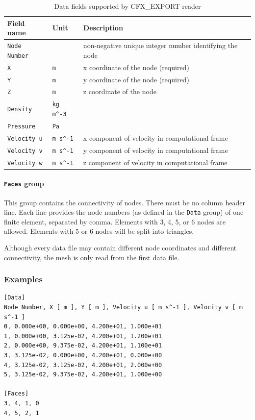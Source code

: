 \documentclass[a4paper,10pt]{article}
\begin{document}
\begin{table}[htb]
\centering
\caption{Data fields supported by CFX\_EXPORT reader}
\label{tab:csv_fields}
\begin{tabular}{lll}
	\textbf{Field name} & \textbf{Unit} & \textbf{Description} \\
	\hline\hline
	\texttt{Node Number} & & non-negative unique integer number identifying the
	node \\
	\hline
	\texttt{X} & \texttt{m} & x coordinate of the node (required) \\
	\hline
	\texttt{Y} & \texttt{m} & y coordinate of the node (required) \\
	\hline
	\texttt{Z} & \texttt{m} & z coordinate of the node \\
	\hline
	\texttt{Density} & \verb|kg m^-3| \\
	\hline
	\texttt{Pressure} & \texttt{Pa} \\
	\hline
	\texttt{Velocity u} & \verb|m s^-1| & x component of velocity in computational
	frame \\
	\hline
	\texttt{Velocity v} & \verb|m s^-1| & y component of velocity in computational
	frame
	\\
	\hline
	\texttt{Velocity w} & \verb|m s^-1| & z component of velocity in computational
	frame \\
	\hline\hline
\end{tabular}
\end{table}

\paragraph{\texttt{Faces} group}
This group contains the connectivity of  nodes. There must be no column header
line. Each  line provides  the node numbers  (as defined in  the \texttt{Data}
group) of one finite element, separated by  comma. Elements with 3, 4, 5, or 6
nodes are allowed. Elements with 5 or 6 nodes will be split into triangles.

Although every data file may  contain different node coordinates and different
connectivity, the mesh is only read from the first data file.

\subsubsection{Examples}
\begin{verbatim}
[Data]
Node Number, X [ m ], Y [ m ], Velocity u [ m s^-1 ], Velocity v [ m s^-1 ]
0, 0.000e+00, 0.000e+00, 4.200e+01, 1.000e+01 
1, 0.000e+00, 3.125e-02, 4.200e+01, 1.200e+01
2, 0.000e+00, 9.375e-02, 4.200e+01, 1.100e+01
3, 3.125e-02, 0.000e+00, 4.200e+01, 0.000e+00
4, 3.125e-02, 3.125e-02, 4.200e+01, 2.000e+00
5, 3.125e-02, 9.375e-02, 4.200e+01, 1.000e+00

[Faces]
3, 4, 1, 0
4, 5, 2, 1
\end{verbatim}
\end{document}
